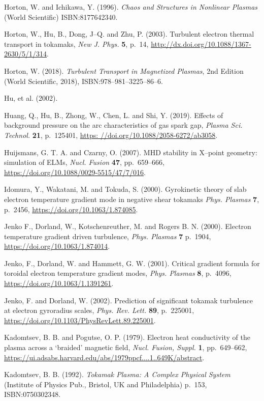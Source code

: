 \documentclass[a4paper,openany,12pt]{book}
\begin{document}
{\begin{thebibliography}{100}
\bibitem{}
Horton, W. and Ichikawa, Y. (1996). \emph{Chaos and Structures in Nonlinear Plasmas} (World Scientific) ISBN:8177642340.

\bibitem{}
Horton, W., Hu, B., Dong, J--Q. and Zhu, P. (2003). Turbulent electron thermal transport in tokamaks, \emph{New J. Phys.} \textbf{5}, p.~14, \url{http://dx.doi.org/10.1088/1367-2630/5/1/314}.

\bibitem{}
Horton, W. (2018). {\it Turbulent Transport in Magnetized Plasmas}, 2nd Edition (World Scientific, 2018), ISBN:978--981--3225--86--6.

\bibitem{}
Hu, et al.  (2002).

\bibitem{}
Huang, Q., Hu, B., Zhong, W., Chen, L. and Shi, Y. (2019). Effects of background pressure on the arc characteristics of gas spark gap, \emph{Plasma Sci. Technol.} \textbf{21}, p.~125401, 
\url{https: //doi.org/10.1088/2058-6272/ab3058}.

\bibitem{}
 Huijsmans, G. T. A. and Czarny, O. (2007). MHD stability in X--point geometry: simulation of ELMs, \emph{Nucl. Fusion} \textbf{47}, pp.~659--666, \url{https://doi.org/10.1088/0029-5515/47/7/016}.

\bibitem{}
Idomura, Y., Wakatani, M. and Tokuda, S. (2000). Gyrokinetic theory of slab electron temperature gradient mode in negative shear tokamaks \emph{Phys. Plasmas} \textbf{7}, p.~2456, \url{https://doi.org/10.1063/1.874085}.

\bibitem{}
Jenko F., Dorland, W., Kotschenreuther, M. and Rogers B. N. (2000). Electron temperature gradient driven turbulence, \emph{Phys. Plasmas} \textbf{7} p.~1904, \url{https://doi.org/10.1063/1.874014}.

\bibitem{}
Jenko, F., Dorland, W. and Hammett, G. W. (2001). Critical gradient formula for toroidal electron temperature gradient modes, \emph{Phys. Plasmas} \textbf{8}, p.~4096, \url{https://doi.org/10.1063/1.1391261}.

\bibitem{}
Jenko, F. and Dorland, W. (2002). Prediction of significant tokamak turbulence at electron gyroradius scales, \emph{Phys. Rev. Lett.} \textbf{89}, p.~225001, \url{https://doi.org/10.1103/PhysRevLett.89.225001}.

\bibitem{}
Kadomtsev, B. B. and Pogutse, O. P. (1979). Electron heat conductivity of the plasma across a `braided' magnetic  field, {\em Nucl. Fusion, Suppl.} \textbf{1}, pp.~649--662,
\url{https://ui.adsabs.harvard.edu/abs/1979ppcf....1..649K/abstract}.

\bibitem{}
Kadomtsev, B. B. (1992). \emph{Tokamak Plasma: A Complex Physical System} (Institute of Physics Pub., Bristol, UK and Philadelphia) p.~153, ISBN:0750302348.


\end{thebibliography}}
\end{document}
